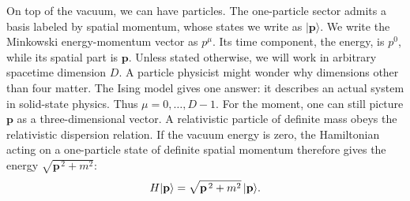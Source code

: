 On top of the vacuum, we can have particles. The one-particle sector admits a
basis labeled by spatial momentum, whose states we write as $|\mathbf p\rangle$.
We write the Minkowski energy-momentum vector as $p^\mu$. Its time component,
the energy, is $p^0$, while its spatial part is $\mathbf p$. Unless stated
otherwise, we will work in arbitrary spacetime dimension $D$. A particle
physicist might wonder why dimensions other than four matter. The Ising model
gives one answer: it describes an actual system in solid-state physics.
Thus $\mu=0,\ldots,D-1$. For the moment, one can still picture $\mathbf p$ as a
three-dimensional vector.
A relativistic particle of definite mass obeys the relativistic dispersion
relation.
If the vacuum energy is zero, the Hamiltonian acting on a one-particle state of
definite spatial momentum therefore gives the energy
$\sqrt{\mathbf p^{\,2}+m^2}$:
\begin{equation}
  H\lvert \mathbf p\rangle
  =\sqrt{\mathbf p^{\,2}+m^2}\,\lvert \mathbf p\rangle.
  \label{eq:253a-one-particle-energy}
\end{equation}

